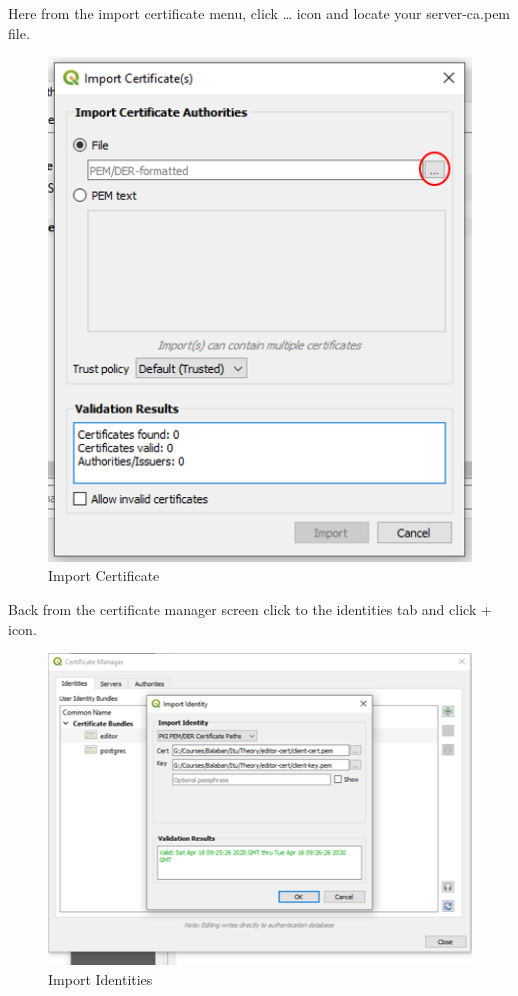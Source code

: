 \documentclass[
]{book}
\begin{document}
Here from the import certificate menu, click \ldots{} icon and locate your server-ca.pem file.

\begin{figure}
\centering
\includegraphics{Images/importcertificate.png}
\caption{Import Certificate}
\end{figure}

Back from the certificate manager screen click to the identities tab and click + icon.

\begin{figure}
\centering
\includegraphics{Images/importIdentity.png}
\caption{Import Identities}
\end{figure}
\end{document}
